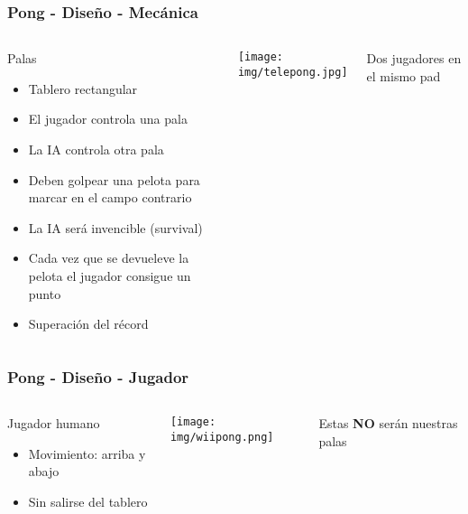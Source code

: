\begin{frame}
	\frametitle{Pong - Diseño - Mecánica}
	
	\begin{columns}[c]
	\column{175pt}	
	
	\begin{block}{Palas}
		\begin{itemize}
			\item Tablero rectangular
			\item El jugador controla una pala
			\item La IA controla otra pala
			\item Deben golpear una pelota para marcar en el campo contrario
			\item La IA será invencible (survival)
			\item Cada vez que se devueleve la pelota el jugador consigue un punto
			\item Superación del récord
		\end{itemize}            
	\end{block}
	
	\column{125pt}
	
	\begin{center}
		\texttt{[image: img/telepong.jpg]}
	\end{center}
	
	\begin{center}
	    Dos jugadores en el mismo pad
	\end{center}	
	
	\end{columns}
	
\end{frame}

\begin{frame}
	\frametitle{Pong - Diseño - Jugador}
	
	\begin{columns}[c]
	\column{175pt}	
	
	\begin{block}{Jugador humano}
		\begin{itemize}
			\item Movimiento: arriba y abajo
			\item Sin salirse del tablero
		\end{itemize}            
	\end{block}
	
	\column{125pt}
	
	\begin{center}
		\texttt{[image: img/wiipong.png]}
	\end{center}	
	
	\begin{center}
	Estas \textbf{NO} serán nuestras palas
	\end{center}
	
	\end{columns}
	
\end{frame}


